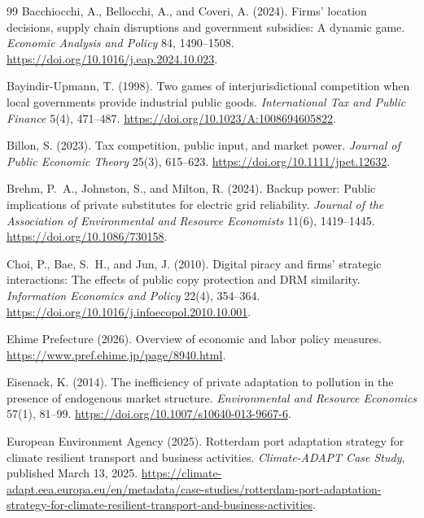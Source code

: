 \begin{thebibliography}{99}
Bacchiocchi, A., Bellocchi, A., and Coveri, A. (2024).
\newblock Firms' location decisions, supply chain disruptions and government subsidies: A dynamic game.
\newblock \emph{Economic Analysis and Policy} 84, 1490--1508. \url{https://doi.org/10.1016/j.eap.2024.10.023}.

Bayindir-Upmann, T. (1998).
\newblock Two games of interjurisdictional competition when local governments provide industrial public goods.
\newblock \emph{International Tax and Public Finance} 5(4), 471--487. \url{https://doi.org/10.1023/A:1008694605822}.

Billon, S. (2023).
\newblock Tax competition, public input, and market power.
\newblock \emph{Journal of Public Economic Theory} 25(3), 615--623. \url{https://doi.org/10.1111/jpet.12632}.

Brehm, P.~A., Johnston, S., and Milton, R. (2024).
\newblock Backup power: Public implications of private substitutes for electric grid reliability.
\newblock \emph{Journal of the Association of Environmental and Resource Economists} 11(6), 1419--1445. \url{https://doi.org/10.1086/730158}.

Choi, P., Bae, S.~H., and Jun, J. (2010).
\newblock Digital piracy and firms' strategic interactions: The effects of public copy protection and DRM similarity.
\newblock \emph{Information Economics and Policy} 22(4), 354--364. \url{https://doi.org/10.1016/j.infoecopol.2010.10.001}.

Ehime Prefecture (2026).
\newblock Overview of economic and labor policy measures.
\newblock \url{https://www.pref.ehime.jp/page/8940.html}.

Eisenack, K. (2014).
\newblock The inefficiency of private adaptation to pollution in the presence of endogenous market structure.
\newblock \emph{Environmental and Resource Economics} 57(1), 81--99. \url{https://doi.org/10.1007/s10640-013-9667-6}.

European Environment Agency (2025).
\newblock Rotterdam port adaptation strategy for climate resilient transport and business activities.
\newblock \emph{Climate-ADAPT Case Study}, published March 13, 2025.
\url{https://climate-adapt.eea.europa.eu/en/metadata/case-studies/rotterdam-port-adaptation-strategy-for-climate-resilient-transport-and-business-activities}.


\end{thebibliography}
